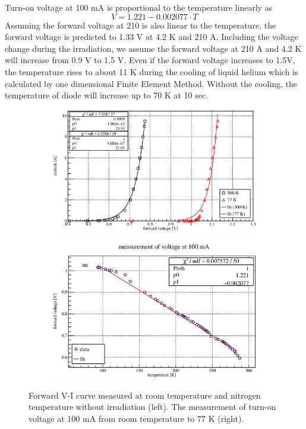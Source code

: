 Turn-on voltage at 100 mA is proportional to the temperature linearly as
\begin{equation}
 V = 1.221 - 0.002077 \cdot T
\end{equation}
Assuming the forward voltage at 210 is also linear to the temperature, the forward voltage is predicted to 1.33 V at 4.2 K and 210 A.
Including the voltage change during the irradiation, we assume the forward voltage at 210 A and 4.2 K will increase from 0.9 V to 1.5 V.
Even if the forward voltage increases to 1.5V, the temperature rises to about 11 K during the cooling of liquid helium which is calculated by one dimensional Finite Element Method.
Without the cooling, the temperature of diode will increase up to 70 K at 10 sec.
 \begin{figure}[H]
  \begin{subfigure}{0.3\textwidth}
   \centering
   \includegraphics[scale=0.43]{chapter4/fig/cryo.eps}
  \end{subfigure}
  \hspace{0.2\textwidth}
  \begin{subfigure}{0.3\textwidth}
   \centering
   \includegraphics[scale=0.43]{chapter4/fig/temp.eps}
  \end{subfigure}
  \caption{Forward V-I curve measured at room temperature and nitrogen temperature without irradiation (left). The measurement of turn-on voltage at 100 mA from room temperature to 77 K (right).}
  \label{3cryo}
 \end{figure}


